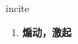 
\begin{frame}
{\huge incite}
\begin{center}
\begin{enumerate}\Large
  \item \textbf{煽动，激起}
\end{enumerate}
\end{center}
\end{frame}
